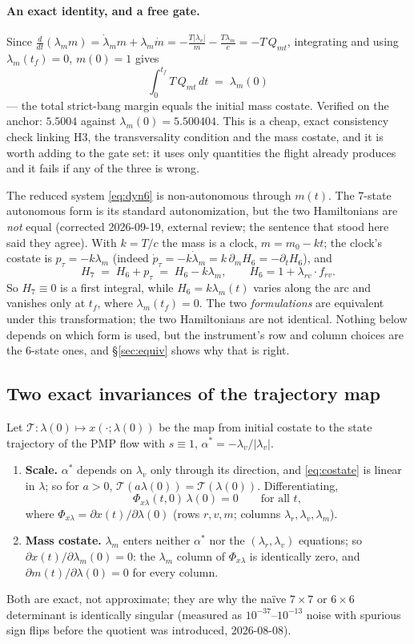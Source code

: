 \documentclass[11pt]{article}
\theoremstyle{definition}
\newcommand{\lv}{\lambda_v}
\newcommand{\lr}{\lambda_r}
\newcommand{\lm}{\lambda_m}
\newcommand{\Phixl}{\Phi_{x\lambda}}
\newcommand{\tf}{t_f}
\begin{document}
\paragraph{An exact identity, and a free gate.} Since
$\frac{d}{dt}(\lm m)=\dot\lm m+\lm\dot m=-\frac{T|\lv|}{m}-\frac{T\lm}{c}=-T\,Q_{mt}$,
integrating and using $\lm(\tf)=0$, $m(0)=1$ gives
\[
  \boxed{\;\int_0^{\tf} T\,Q_{mt}\,dt \;=\; \lm(0)\;}
\]
--- the total strict-bang margin equals the initial mass costate. Verified on
the anchor: $5.5004$ against $\lm(0)=5.500404$. This is a cheap, exact
consistency check linking H3, the transversality condition and the mass
costate, and it is worth adding to the gate set: it uses only quantities the
flight already produces and it fails if any of the three is wrong.

The reduced system \eqref{eq:dyn6} is non-autonomous through $m(t)$. The
7-state autonomous form is its standard autonomization, but the two
Hamiltonians are \emph{not} equal (corrected 2026-09-19, external review; the
sentence that stood here said they agree). With $k=T/c$ the mass is a clock,
$m=m_0-kt$; the clock's costate is $p_\tau=-k\lm$ (indeed
$\dot p_\tau=-k\dot\lambda_m=k\,\partial_mH_6=-\partial_tH_6$), and
\[
  H_7\;=\;H_6+p_\tau\;=\;H_6-k\lm ,\qquad H_6=1+\lambda_{rv}\!\cdot\!f_{rv}.
\]
So $H_7\equiv0$ is a first integral, while $H_6=k\lm(t)$ varies along the arc
and vanishes only at $\tf$, where $\lm(\tf)=0$. The two \emph{formulations} are
equivalent under this transformation; the two Hamiltonians are not identical.
Nothing below depends on which form is used, but the instrument's row and column
choices are the 6-state ones, and \S\ref{sec:equiv} shows why that is right.

\subsection{Two exact invariances of the trajectory map}
Let $\mathcal T:\lambda(0)\mapsto x(\cdot;\lambda(0))$ be the map from initial
costate to the state trajectory of the PMP flow with $s\equiv1$,
$\alpha^*=-\lv/|\lv|$.
\begin{enumerate}
\item \textbf{Scale.} $\alpha^*$ depends on $\lv$ only through its direction,
and \eqref{eq:costate} is linear in $\lambda$; so for $a>0$,
$\mathcal T(a\lambda(0))=\mathcal T(\lambda(0))$. Differentiating,
\begin{equation}\label{eq:scale}
\Phixl(t,0)\,\lambda(0)=0\qquad\text{for all }t,
\end{equation}
where $\Phixl=\partial x(t)/\partial\lambda(0)$ (rows $r,v,m$; columns
$\lr,\lv,\lm$).
\item \textbf{Mass costate.} $\lm$ enters neither $\alpha^*$ nor the $(\lr,\lv)$
equations; so $\partial x(t)/\partial\lm(0)=0$: the $\lm$ column of $\Phixl$ is
identically zero, and $\partial m(t)/\partial\lambda(0)=0$ for every column.
\end{enumerate}
Both are exact, not approximate; they are why the na\"ive $7\times7$ or $6\times6$
determinant is identically singular (measured as $10^{-37}$--$10^{-13}$ noise
with spurious sign flips before the quotient was introduced, 2026-08-08).
\end{document}
